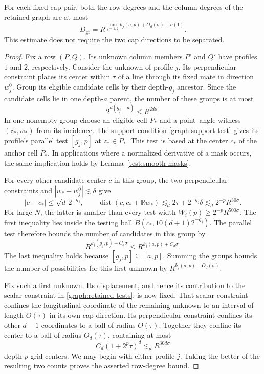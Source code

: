 \begin{lemma}\label{graph:degrees}
For each fixed cap pair, both the row degrees and the column degrees
of the retained graph are at most
\begin{equation}\label{graph:degree-bound}
 D_{\mathrm{gr}}=
 R^{\min_{j=1,2}k_j(a,p)+O_d(\sigma)+o(1)}.
\end{equation}
This estimate does not require the two cap directions to be separated.
\end{lemma}

\begin{proof}
Fix a row $(P,Q)$.  Its unknown column members $P'$ and $Q'$ have
profiles $1$ and $2$, respectively.  Consider the unknown of profile
$j$.  Its perpendicular constraint places its center within $\tau$ of
a line through its fixed mate in direction $w_j^0$.  Group its eligible
candidate cells by their depth-$g_j$ ancestor.  Since the candidate
cells lie in one depth-$a$ parent, the number of these groups is at
most
\[
 2^{d(g_j-a)}\le R^{2d\sigma}.
\]
In one nonempty group choose an eligible cell $P_*$ and a point--angle
witness $(z_*,w_*)$ from its incidence.  The support condition
\eqref{graph:support-test} gives its profile's parallel test
$[g_j,p]$ at $z_*\in P_*$.  This test is based at the center $c_*$ of
the anchor cell $P_*$.  In applications where a
normalized derivative of a mask occurs, the same implication holds by
Lemma~\ref{test:smooth-masks}.

For every other candidate center $c$ in this group, the two
perpendicular constraints and $|w_*-w_j^0|\lesssim\delta$ give
\begin{equation}\label{graph:witness-tube}
 |c-c_*|\le\sqrt d\,2^{-g_j},\qquad
 \operatorname{dist}(c,c_*+\mathbb Rw_*)
 \lesssim_d2\tau+2^{-g_j}\delta
 \lesssim_d2^{-p}R^{30\sigma}.
\end{equation}
For large $N$, the latter is smaller than every test width
$W_i(p)\ge2^{-p}R^{500\sigma}$.  The first inequality lies inside the
testing ball $B(c_*,10(d+1)2^{-g_j})$.  The parallel test therefore
bounds the number of candidates in this group by
\[
 R^{k_j(g_j,p)+C_d\sigma}
 \le R^{k_j(a,p)+C_d\sigma}.
\]
The last inequality holds because $[g_j,p]\subseteq[a,p]$.
Summing the groups bounds the number of possibilities for this first
unknown by $R^{k_j(a,p)+O_d(\sigma)}$.

Fix such a first unknown.  Its displacement, and hence its contribution
to the scalar constraint in \eqref{graph:retained-tests}, is now fixed.
That scalar constraint confines the longitudinal coordinate of the
remaining unknown to an interval of length $O(\tau)$ in its own cap
direction.  Its perpendicular constraint confines its other $d-1$
coordinates to a ball of radius $O(\tau)$.  Together they confine its
center to a ball of radius $O_d(\tau)$, containing at most
\[
 C_d(1+2^p\tau)^d\lesssim_d R^{30d\sigma}
\]
depth-$p$ grid centers.  We may begin with either profile $j$.
Taking the better of the resulting two counts proves the asserted
row-degree bound.


\end{proof}
